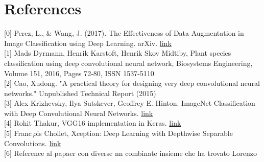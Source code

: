 \documentclass[11pt, oneside]{article}
\begin{document}
\section*{References}
[0] Perez, L., \& Wang, J. (2017). The Effectiveness of Data Augmentation in Image Classification using Deep Learning. arXiv. \href{https://doi.org/10.48550/arXiv.1712.04621}{link}\\
{[1]} Mads Dyrmann, Henrik Karstoft, Henrik Skov Midtiby, Plant species classification using deep convolutional neural network, Biosystems Engineering, Volume 151, 2016, Pages 72-80, ISSN 1537-5110 \\
{[2]} Cao, Xudong. "A practical theory for designing very deep convolutional neural networks." Unpublished Technical Report (2015)\\
{[3]} Alex Krizhevsky, Ilya Sutskever, Geoffrey E. Hinton. ImageNet Classification with Deep Convolutional Neural Networks. \href{https://proceedings.neurips.cc/paper/2012/file/c399862d3b9d6b76c8436e924a68c45b-Paper.pdf}{link} \\
{[4]} Rohit Thakur, VGG16 implementation in Keras. \href{https://towardsdatascience.com/step-by-step-vgg16-implementation-in-keras-for-beginners-a833c686ae6c}{link}\\
{[5]} Franc ̧ois Chollet, Xception: Deep Learning with Depthwise Separable Convolutions. \href{https://arxiv.org/pdf/1610.02357.pdf}{link}\\
{[6]} Reference al papaer con diverse nn combinate insieme che ha trovato Lorenzo
\end{document}
